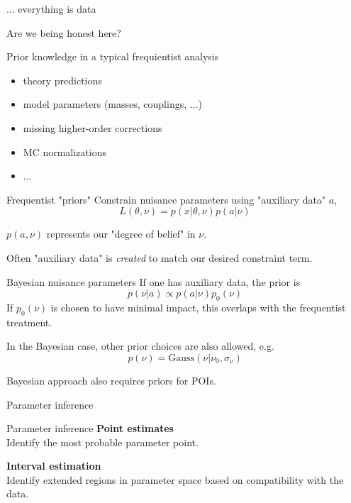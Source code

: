\documentclass[
aspectratio=169,
14pt,
professionalfonts
]{beamer}
\begin{document}
\begin{frame}{... everything is data}    

    


    {\centering Are we being honest here?}
    
    Prior knowledge in a typical frequientist analysis
    \begin{itemize}
        \item theory predictions
        \item model parameters (masses, couplings, ...)
        \item missing higher-order corrections
        \item MC normalizations
        \item ...
    \end{itemize}
\end{frame}

\begin{frame}{Frequentist "priors"}
Constrain nuisance parameters using "auxiliary data" $a$,
$$L(\theta, \nu) = p(x| \theta, \nu) p(a| \nu)$$

$p(a, \nu)$ represents our "degree of belief" in $\nu$.

\vspace{0.5cm}

Often "auxiliary data" is \textit{created} to match our desired constraint term.
\end{frame}

\begin{frame}{Bayesian nuisance parameters}
If one has auxiliary data, the prior is
$$p(\nu|a) \propto p(a|\nu) p_0(\nu)$$
If $p_0(\nu)$ is chosen to have minimal impact, this overlaps with the frequentist treatment.

In the Bayesian case, other prior choices are also allowed, e.g.
$$ p(\nu) = \text{Gauss}(\nu | \nu_0, \sigma_\nu)$$

Bayesian approach also requires priors for POIs.
\end{frame}

\begin{frame}
\center
\Large
Parameter inference
\end{frame}

\begin{frame}{Parameter inference}
    \center
    \textbf{Point estimates}\\
    Identify the most probable parameter point.
    
    \vspace{1cm}
    
    \textbf{Interval estimation}\\
    Identify extended regions in parameter space based on compatibility with the data.
\end{frame}
\end{document}
